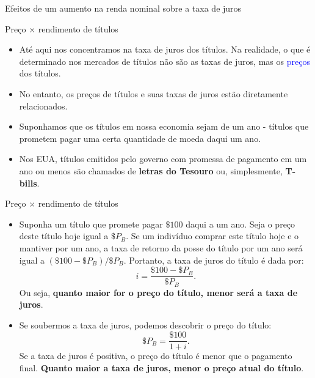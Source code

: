 \documentclass[10pt]{beamer}
\begin{document}
\begin{frame}{Efeitos de um aumento na renda nominal sobre a taxa de juros}
\begin{frame}{Preço $\times$ rendimento de títulos}
    \begin{itemize}
        \item Até aqui nos concentramos na taxa de juros dos títulos. Na realidade, o que é determinado nos mercados de títulos não são as taxas de juros, mas os \textcolor{blue}{preços} dos títulos.
        \bigskip
        \item No entanto, os preços de títulos e suas taxas de juros estão diretamente relacionados.
        \bigskip
        \item Suponhamos que os títulos em nossa economia sejam de um ano - títulos que prometem pagar uma certa quantidade de moeda daqui um ano.
        \bigskip
        \item Nos EUA, títulos emitidos pelo governo com promessa de pagamento em um ano ou menos são chamados de \textbf{letras do Tesouro} ou, simplesmente, \textbf{T-bills}.
    \end{itemize}
\end{frame}

\begin{frame}{Preço $\times$ rendimento de títulos}
\begin{itemize}
    \item Suponha um título que promete pagar $\$ 100$ daqui a um ano. Seja o preço deste título hoje igual a $\$ P_B$. Se um indivíduo comprar este título hoje e o mantiver por um ano, a taxa de retorno da posse do título por um ano será igual a $(\$ 100 - \$P_B)/\$ P_B$. Portanto, a taxa de juros do título é dada por:
    \[
    i = \frac{\$ 100 - \$P_B}{\$P_B}.
    \]
    Ou seja, \textbf{quanto maior for o preço do título, menor será a taxa de juros}.
    \bigskip
    \item Se soubermos a taxa de juros, podemos descobrir o preço do título:
    \[
    \$P_B = \frac{\$100}{1 + i}.
    \]
    Se a taxa de juros é positiva, o preço do título é menor que o pagamento final. \textbf{Quanto maior a taxa de juros, menor o preço atual do título}.
\end{itemize}
\end{frame}


\end{frame}
\end{document}

